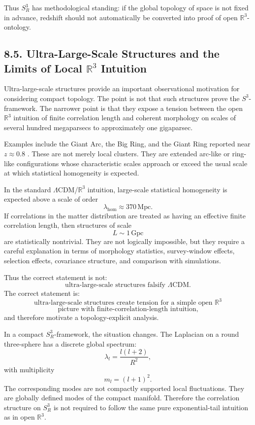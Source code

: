 \documentclass[12pt,a4paper]{article}
\theoremstyle{definition}
\begin{document}
Thus \(S^3_R\) has methodological standing: if the global topology of space is not fixed in advance, redshift should not automatically be converted into proof of open \(\mathbb R^3\)-ontology.

\subsection*{8.5. Ultra-Large-Scale Structures and the Limits of Local \(\mathbb R^3\) Intuition}

Ultra-large-scale structures provide an important observational motivation for considering compact topology. The point is not that such structures prove the \(S^3\)-framework. The narrower point is that they expose a tension between the open \(\mathbb R^3\) intuition of finite correlation length and coherent morphology on scales of several hundred megaparsecs to approximately one gigaparsec.

Examples include the Giant Arc, the Big Ring, and the Giant Ring reported near \(z\approx0.8\) \cite{Lopezetal2024,LopezCorredoira2022}. These are not merely local clusters. They are extended arc-like or ring-like configurations whose characteristic scales approach or exceed the usual scale at which statistical homogeneity is expected.

In the standard \(\Lambda\)CDM/\(\mathbb R^3\) intuition, large-scale statistical homogeneity is expected above a scale of order
\[
\lambda_{\mathrm{hom}}\approx 370\,\mathrm{Mpc}.
\]
If correlations in the matter distribution are treated as having an effective finite correlation length, then structures of scale
\[
L\sim 1\,\mathrm{Gpc}
\]
are statistically nontrivial. They are not logically impossible, but they require a careful explanation in terms of morphology statistics, survey-window effects, selection effects, covariance structure, and comparison with simulations.

Thus the correct statement is not:
\[
\text{ultra-large-scale structures falsify }\Lambda\mathrm{CDM}.
\]
The correct statement is:
\[
\text{ultra-large-scale structures create tension for a simple open } \mathbb{R}^3
\]
\[
\text{picture with finite-correlation-length intuition,}
\]
and therefore motivate a topology-explicit analysis.

In a compact \(S^3_R\)-framework, the situation changes. The Laplacian on a round three-sphere has a discrete global spectrum:
\[
\lambda_l=\frac{l(l+2)}{R^2},
\]
with multiplicity
\[
m_l=(l+1)^2.
\]
The corresponding modes are not compactly supported local fluctuations. They are globally defined modes of the compact manifold. Therefore the correlation structure on \(S^3_R\) is not required to follow the same pure exponential-tail intuition as in open \(\mathbb R^3\).
\end{document}

